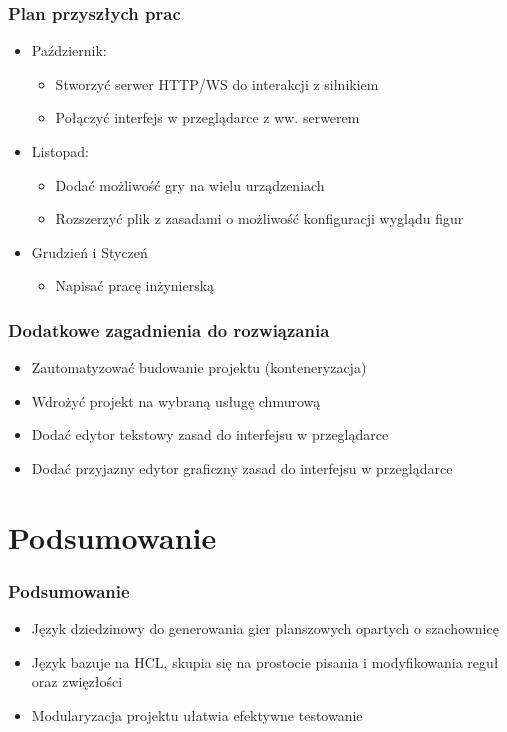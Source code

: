 \documentclass{beamer}
\begin{document}
\begin{frame}
	\frametitle{Plan przyszłych prac}
	\begin{itemize}
		\item Październik:
		      \begin{itemize}
			      \item Stworzyć serwer HTTP/WS do interakcji z silnikiem
			      \item Połączyć interfejs w przeglądarce z ww. serwerem
		      \end{itemize}
		\item Listopad:
		      \begin{itemize}
			      \item Dodać możliwość gry na wielu urządzeniach
			      \item Rozszerzyć plik z zasadami o możliwość konfiguracji wyglądu figur
		      \end{itemize}
		\item Grudzień i Styczeń
		      \begin{itemize}
			      \item Napisać pracę inżynierską
		      \end{itemize}
	\end{itemize}
\end{frame}

\begin{frame}
	\frametitle{Dodatkowe zagadnienia do rozwiązania}
	\begin{itemize}
		\item Zautomatyzować budowanie projektu (konteneryzacja)
		\item Wdrożyć projekt na wybraną usługę chmurową
		\item Dodać edytor tekstowy zasad do interfejsu w przeglądarce
		\item Dodać przyjazny edytor graficzny zasad do interfejsu w przeglądarce
	\end{itemize}
\end{frame}

\section{Podsumowanie}

\begin{frame}
	\frametitle{Podsumowanie}

	\begin{itemize}
		\item Język dziedzinowy do generowania gier planszowych opartych o szachownicę
		\item Język bazuje na HCL, skupia się na prostocie pisania i modyfikowania reguł oraz zwięzłości
		\item Modularyzacja projektu ułatwia efektywne testowanie
	\end{itemize}
\end{frame}
\end{document}
